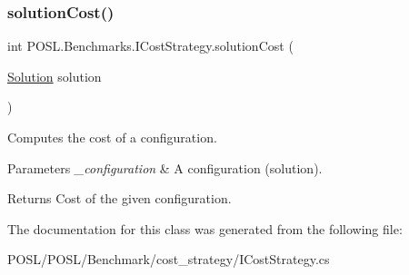 \subsubsection{\texorpdfstring{solution\+Cost()}{solutionCost()}}
{\footnotesize\ttfamily int P\+O\+S\+L.\+Benchmarks.\+I\+Cost\+Strategy.\+solution\+Cost (\begin{DoxyParamCaption}\item[{\hyperlink{classPOSL_1_1Data_1_1Solution}{Solution}}]{solution }\end{DoxyParamCaption})}



Computes the cost of a configuration. 


\begin{DoxyParams}{Parameters}
{\em \+\_\+configuration} & A configuration (solution). \\
\hline
\end{DoxyParams}
\begin{DoxyReturn}{Returns}
Cost of the given configuration. 
\end{DoxyReturn}


The documentation for this class was generated from the following file\+:\begin{DoxyCompactItemize}
\item 
P\+O\+S\+L/\+P\+O\+S\+L/\+Benchmark/cost\+\_\+strategy/I\+Cost\+Strategy.\+cs\end{DoxyCompactItemize}
